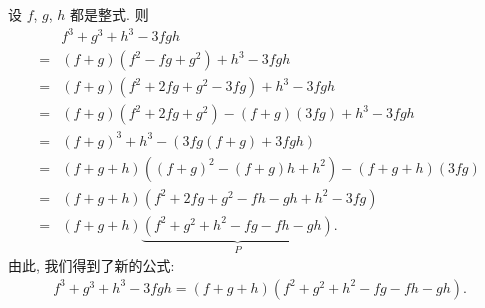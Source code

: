 \begin{example}
    设 $f$, $g$, $h$ 都是整式. 则
    \begin{align*}
             & f^3 + g^3 + h^3 - 3fgh                                        \\
        = {} & (f + g)(f^2 - fg + g^2) + h^3 - 3fgh                          \\
        = {} & (f + g)(f^2 + 2fg + g^2 - 3fg) + h^3 - 3fgh                   \\
        = {} & (f + g)(f^2 + 2fg + g^2) - (f + g)(3fg) + h^3 - 3fgh          \\
        = {} & (f + g)^3 + h^3 - (3fg(f + g) + 3fgh)                         \\
        = {} & (f + g + h)((f + g)^2 - (f + g)h + h^2) - (f + g + h)(3fg)    \\
        = {} & (f + g + h)(f^2 + 2fg + g^2 - fh - gh + h^2 - 3fg)            \\
        = {} & (f + g + h)\underbrace{(f^2 + g^2 + h^2 - fg - fh - gh)}_{P}.
    \end{align*}
    由此, 我们得到了新的公式:
    \begin{align*}
        f^3 + g^3 + h^3 - 3fgh = (f + g + h)(f^2 + g^2 + h^2 - fg - fh - gh).
    \end{align*}


\end{example}
